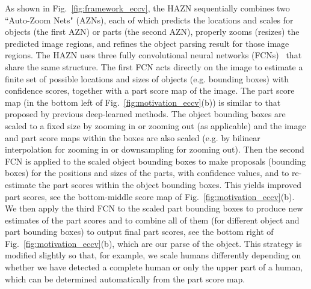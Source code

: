 As shown in Fig.~\ref{fig:framework_eccv}, the HAZN sequentially combines two ``Auto-Zoom Nets" (AZNs), each of which predicts the locations and scales for objects (the first AZN) or parts (the second AZN), properly zooms (resizes) the predicted image regions, and refines the object parsing result for those image regions. The HAZN uses three fully convolutional neural networks (FCNs)~\cite{long2015fully} that share the same structure. The first FCN acts directly on the image to estimate a finite set of possible locations and sizes of objects (e.g. bounding boxes) with confidence scores, together with a part score map of the image. The part score map (in the bottom left of Fig.~\ref{fig:motivation_eccv}(b)) is similar to that proposed by previous deep-learned methods. The object bounding boxes are scaled to a fixed size by zooming in or zooming out (as applicable) and the image and part score maps within the boxes are also scaled (e.g. by bilinear interpolation for zooming in or downsampling for zooming out). Then the second FCN is applied to the scaled object bounding boxes to make proposals (bounding boxes) for the positions and sizes of the parts, with confidence values, and to re-estimate the part scores within the object bounding boxes. This yields improved part scores, see the bottom-middle score map of Fig.~\ref{fig:motivation_eccv}(b). We then apply the third FCN to the scaled part bounding boxes to produce new estimates of the part scores and to combine all of them (for different object and part bounding boxes) to output final part scores, see the bottom right of Fig.~\ref{fig:motivation_eccv}(b), which are our parse of the object. This strategy is modified slightly so that, for example, we scale humans differently depending on whether we have detected a complete human or only the upper part of a human, which can be determined automatically from the part score map.

